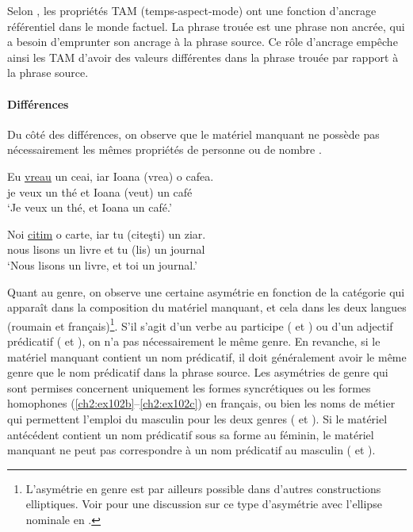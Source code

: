 Selon \citet{Repp2009}, les propriétés TAM (temps-aspect-mode) ont une fonction d’ancrage référentiel dans le monde factuel. La phrase trouée est une phrase non ancrée, qui a besoin d’emprunter son ancrage à la phrase source. Ce rôle d’ancrage empêche ainsi les TAM d’avoir des valeurs différentes dans la phrase trouée par rapport à la phrase source.

\paragraph{Différences} 

Du côté des différences, on observe que le matériel manquant ne possède pas nécessairement les mêmes propriétés de personne  ou de nombre .

\ea
\ea 
\gll Eu  \uline{vreau}  un  ceai,  iar  Ioana  (vrea)  o  cafea. \label{ch2:ex99a}\\
je  veux  un  thé  et  Ioana  (veut)  un  café\\
\glt ‘Je veux un thé, et Ioana un café.’

\ex 
\gll Noi  \uline{citim}  o  carte,  iar  tu  (citeşti)  un  ziar. \label{ch2:ex99b}\\
nous  lisons  un  livre  et  tu  (lis)  un  journal\\
\glt ‘Nous lisons un livre, et toi un journal.’
\z
\z

Quant au genre, on observe une certaine asymétrie en fonction de la catégorie qui apparaît dans la composition du matériel manquant, et cela dans les deux langues (roumain et français)\footnote{
 L’asymétrie en genre est par ailleurs possible dans d’autres constructions elliptiques. Voir \citet{Merchant2011} pour une discussion sur ce type d’asymétrie avec l’ellipse nominale en .}. S’il s’agit d’un verbe au participe ( et ) ou d’un adjectif prédicatif ( et ), on n’a pas nécessairement le même genre. En revanche, si le matériel manquant contient un nom prédicatif, il doit généralement avoir le même genre que le nom prédicatif dans la phrase source. Les asymétries de genre qui sont permises concernent uniquement les formes syncrétiques  ou les formes homophones (\ref{ch2:ex102b}--\ref{ch2:ex102c}) en français, ou bien les noms de métier qui permettent l’emploi du masculin pour les deux genres ( et ). Si le matériel antécédent contient un nom prédicatif sous sa forme au féminin, le matériel manquant ne peut pas correspondre à un nom prédicatif au masculin ( et ). 

